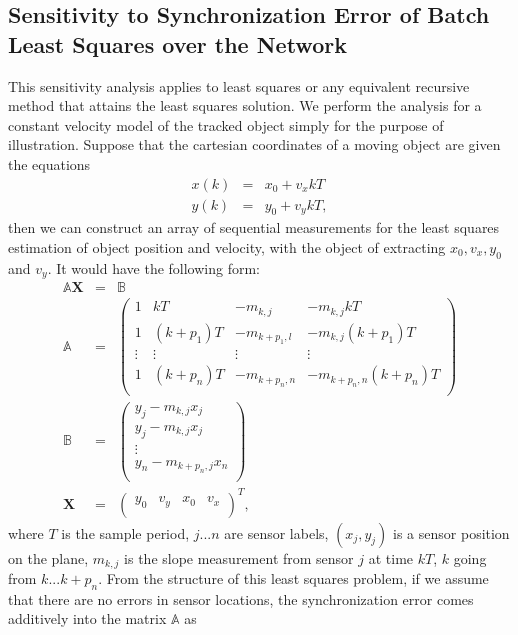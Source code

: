 \subsection{Sensitivity to Synchronization Error of Batch Least Squares over the Network}\label{sec:least_square}
This sensitivity analysis applies to least squares or any equivalent
recursive method that attains the least squares solution. We perform
the analysis for a constant velocity model of the tracked object
simply for the purpose of illustration. Suppose that the cartesian
coordinates of a moving object are given the equations
\begin{eqnarray}
x(k)&=&x_0+v_xkT\label{eqn:xconstvel}\\
y(k)&=&y_0+v_ykT\label{eqn:yconstvel},
\end{eqnarray}
then we can construct an array of sequential measurements for the least squares estimation of object position and velocity, with the object of extracting $x_0, v_x, y_0$ and $v_y$. It would have the following form:
\begin{eqnarray}
\mathbb{A}\mathbf{X}&=&\mathbb{B}\label{eqn:batchls1}\\
\mathbb{A}&=&\begin{pmatrix}
               1 & kT & -m_{k,j} &-m_{k,j}kT  \\
               1 & (k+p_1)T & -m_{k+p_1,l} & -m_{k,j}(k+p_1)T \\
               \vdots & \vdots & \vdots & \vdots \\
               1 & (k+p_n)T & -m_{k+p_n,n} & -m_{k+p_n,n}(k+p_n)T \\
             \end{pmatrix}\nonumber\\
\mathbb{B}&=&\begin{pmatrix}
               y_j-m_{k,j}x_j \\
               y_j-m_{k,j}x_j \\
               \vdots \\
               y_n-m_{k+p_n,j}x_n \\
             \end{pmatrix}\nonumber\\
\mathbf{X}&=&\begin{pmatrix}
               y_0 & v_y & x_0 & v_x \\
             \end{pmatrix}^T\nonumber,
\end{eqnarray}
where $T$ is the sample period, $j...n$ are sensor labels, $(x_j,y_j)$ is a sensor position on the plane, $m_{k,j}$ is the slope measurement from sensor $j$ at time $kT$, $k$ going from $k...k+p_n$. From the structure of this least squares problem, if we assume that there are no errors in sensor locations, the synchronization error comes additively into the matrix $\mathbb{A}$ as
